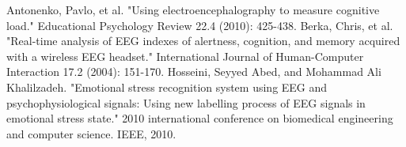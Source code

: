 \documentclass{llncs} %
\begin{document}
\begin{thebibliography}{[MT1]}
    Antonenko, Pavlo, et al. "Using electroencephalography to measure cognitive load." Educational Psychology Review 22.4 (2010): 425-438.
    Berka, Chris, et al. "Real-time analysis of EEG indexes of alertness, cognition, and memory acquired with a wireless EEG headset." International Journal of Human-Computer Interaction 17.2 (2004): 151-170.
    Hosseini, Seyyed Abed, and Mohammad Ali Khalilzadeh. "Emotional stress recognition system using EEG and psychophysiological signals: Using new labelling process of EEG signals in emotional stress state." 2010 international conference on biomedical engineering and computer science. IEEE, 2010.
\end{thebibliography}
\end{document}
